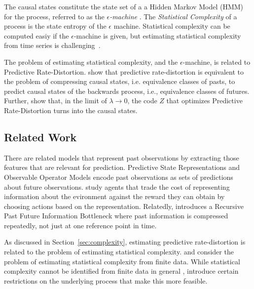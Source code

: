 \documentclass[11pt,letterpaper]{article}
\begin{document}
The causal states constitute the state set of a a Hidden Markov Model (HMM) for the process, referred to as the \emph{$\epsilon$-machine}  \citep{crutchfield-inferring-1989}.
The \emph{Statistical Complexity} of a process is the state entropy of the $\epsilon$ machine.
Statistical complexity can be computed easiy if the $\epsilon$-machine is given, but estimating statistical complexity from time series is challenging~\citep{clarke2003application}.

The problem of estimating statistical complexity, and the $\epsilon$-machine, is related to Predictive Rate-Distortion.
\citet{marzen-predictive-2016} show that predictive rate-distortion is equivalent to the problem of compressing causal states, i.e. equivalence classes of pasts, to predict causal states of the backwards process, i.e., equivalence classes of futures.
Further, \cite{still-optimal-2010} show that, in the limit of $\lambda \rightarrow 0$, the code $Z$ that optimizes Predictive Rate-Distortion turns into the causal states.



\subsection{Related Work}




There are related models that represent past observations by extracting those features that are relevant for prediction.
Predictive State Representations \citep{singh-learning-2003,singh-predictive-2004} and Observable Operator Models \citep{jaeger1998discrete} encode past observations as sets of predictions about future observations.
\citet{rubin2012trading} study agents that trade the cost of representing information about the evironment against the reward they can obtain by choosing actions based on the representation.
Relatedly, \citet{still-information-2014} introduces a Recursive Past Future Information Bottleneck where past information is compressed repeatedly, not just at one reference point in time.


As discussed in Section~\ref{sec:complexity}, estimating predictive rate-distortion is related to the problem of estimating statistical complexity.
\citet{clarke2003application} and \citet{still-optimal-2010} consider the problem of estimating statistical complexity from finite data.
While statistical complexity cannot be identified from finite data in general \citep{clarke2003application}, \citet{clarke2003application} introduce certain restrictions on the underlying process that make this more feasible.
\end{document}
